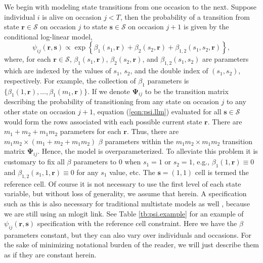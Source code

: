\documentclass[sts]{imsart}
\numberwithin{equation}{section}
\theoremstyle{plain}
\newcommand{\bs}{\ensuremath{\mathbf{s}}}
\newcommand{\fS}{\ensuremath{\mathcal{S}}}
\newcommand{\br}{\ensuremath{\mathbf{r}}}
\begin{document}
We begin with modeling state transitions from one occasion to the next. Suppose individual $i$ is alive on occasion $j<T$, then the probability of a transition from state $\br\in\fS$ on occasion $j$ to state $\bs\in\fS$ on occasion $j+1$ is given by the conditional log-linear model, 
\begin{equation}
\label{eqn:psi.llm}
\psi_{ij}(\br,\bs) \propto \exp\left\{\beta_1(s_1,\br) + \beta_2(s_2,\br) + \beta_{1,2}(s_1,s_2,\br)\right\},
\end{equation}
where, for each $\br\in\fS$, $\beta_1(s_1,\br)$, $\beta_2(s_2,\br)$, and $\beta_{1,2}(s_1,s_2)$ are parameters which are indexed by the values of $s_1$, $s_2$, and the double index of $(s_1,s_2)$, respectively. For example, the collection of $\beta_1$ parameters is $\{\beta_1(1,\br),\dots,\beta_1(m_1,\br)\}$. If we denote $\boldsymbol{\Psi}_{ij}$ to be the transition matrix describing the probability of transitioning from any state on occasion $j$ to any other state on occasion $j+1$, equation (\ref{eqn:psi.llm}) evaluated for all $\bs\in \fS$ would form the rows associated with each possible current state $\br$. There are $m_1+m_2+m_1m_2$ parameters for each $\br$. Thus, there are $m_1m_2 \times (m_1+m_2+m_1m_2)$ $\beta$ parameters within the $m_1m_2\times m_1m_2$ transition matrix $\boldsymbol{\Psi}_{ij}$. Hence, the model is overparameterized. To alleviate this problem it is customary to fix all $\beta$ parameters to $0$ when $s_1=1$ or $s_2=1$, e.g., $\beta_1(1,\br)\equiv 0$ and $\beta_{1,2}(s_1,1,\br)\equiv 0$ for any $s_1$ value, etc. The $\bs=(1,1)$ cell is termed the reference cell. Of course it is not necessary to use the first level of each state variable, but without loss of generality, we assume that herein. A specification such as this is also necessary for traditional multistate models as well \citep{Laake:2013ab}, because we are still using an mlogit link. See Table \ref{tb:psi.example} for an example of $\psi_{ij}(\br,\bs)$ specification with the reference cell constraint. Here we have  the $\beta$ parameters constant, but they can also vary over individuals and occasions. For the sake of minimizing notational burden of the reader, we will just describe them as if they are constant herein. 
\end{document}
